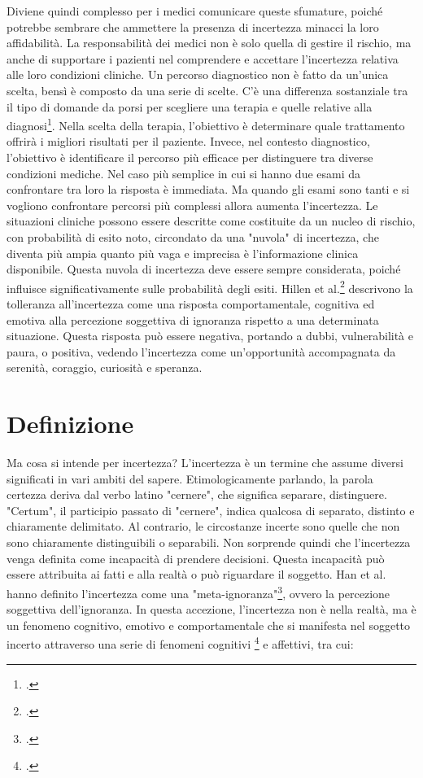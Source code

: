 Diviene quindi complesso per i medici comunicare queste sfumature, poiché potrebbe sembrare che ammettere la presenza di incertezza minacci la loro affidabilità. La responsabilità dei medici non è solo quella di gestire il rischio, ma anche di supportare i pazienti nel comprendere e accettare l'incertezza relativa alle loro condizioni cliniche. 
Un percorso diagnostico non è fatto da un'unica scelta, bensì è composto da una serie di scelte. C'è una differenza sostanziale tra il tipo di domande da porsi per scegliere una terapia e quelle relative alla diagnosi\footcite{womak:arte-probabilita-coen}. Nella scelta della terapia, l'obiettivo è determinare quale trattamento offrirà i migliori risultati per il paziente. Invece, nel contesto diagnostico, l'obiettivo è identificare il percorso più efficace per distinguere tra diverse condizioni mediche.
Nel caso più semplice in cui si hanno due esami da confrontare tra loro la risposta è immediata. Ma quando gli esami sono tanti e si vogliono confrontare percorsi più complessi allora aumenta l'incertezza. 
Le situazioni cliniche possono essere descritte come costituite da un nucleo di rischio, con probabilità di esito noto, circondato da una "nuvola" di incertezza, che diventa più ampia quanto più vaga e imprecisa è l'informazione clinica disponibile. Questa nuvola di incertezza deve essere sempre considerata, poiché influisce significativamente sulle probabilità degli esiti.
Hillen et al.\footcite{womak:tolleranza-incertezza} descrivono la tolleranza all'incertezza come una risposta comportamentale, cognitiva ed emotiva alla percezione soggettiva di ignoranza rispetto a una determinata situazione. Questa risposta può essere negativa, portando a dubbi, vulnerabilità e paura, o positiva, vedendo l'incertezza come un'opportunità accompagnata da serenità, coraggio, curiosità e speranza.


\section{Definizione}

Ma cosa si intende per incertezza? L'incertezza è un termine che assume diversi significati in vari ambiti del sapere. Etimologicamente parlando, la parola certezza deriva dal verbo latino "cernere", che significa separare, distinguere. "Certum", il participio passato di "cernere", indica qualcosa di separato, distinto e chiaramente delimitato. Al contrario, le circostanze incerte sono quelle che non sono chiaramente distinguibili o separabili. Non sorprende quindi che l'incertezza venga definita come incapacità di prendere decisioni. Questa incapacità può essere attribuita ai fatti e alla realtà o può riguardare il soggetto. Han et al. hanno definito l'incertezza come una "meta-ignoranza"\footcite{womak:meta-ignoranza}, ovvero la percezione soggettiva dell'ignoranza. In questa accezione, l'incertezza non è nella realtà, ma è un fenomeno cognitivo, emotivo e comportamentale che si manifesta nel soggetto incerto attraverso una serie di fenomeni cognitivi \footcite{womak:recenti-progressi-medicina} e affettivi, tra cui:

